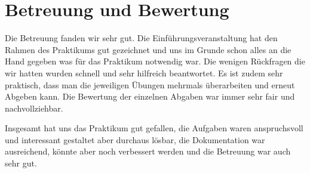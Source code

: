 \documentclass[paper=a4, fontsize=12pt,titlepage=false]{scrartcl}
\begin{document}
\section{Betreuung und Bewertung}

Die Betreuung fanden wir sehr gut. Die Einführungsveranstaltung hat den Rahmen des Praktikums gut gezeichnet und uns im Grunde schon alles an die Hand gegeben was für das Praktikum notwendig war. Die wenigen Rückfragen die wir hatten wurden schnell und sehr hilfreich beantwortet. Es ist zudem sehr praktisch, dass man die jeweiligen Übungen mehrmals überarbeiten und erneut Abgeben kann. Die Bewertung der einzelnen Abgaben war immer sehr fair und nachvollziehbar.

Insgesamt hat uns das Praktikum gut gefallen, die Aufgaben waren anspruchsvoll und interessant gestaltet aber durchaus lösbar, die Dokumentation war ausreichend, könnte aber noch verbessert werden und die Betreuung war auch sehr gut.
\end{document}
